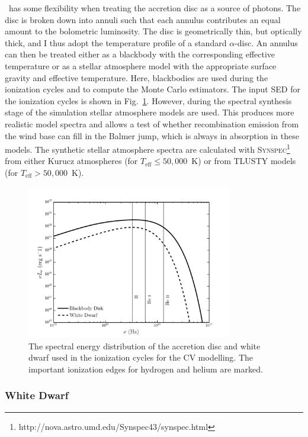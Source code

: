 \py\ has some flexibility when treating the accretion 
disc as a source of photons. The disc is broken down into annuli 
such that each annulus contributes an equal amount to the bolometric
luminosity. The disc is geometrically thin, but optically
thick, and I thus adopt the temperature profile of a standard
\cite{shakurasunyaev1973} $\alpha$-disc. An annulus can then
be treated either as a blackbody with the corresponding effective
temperature or as a stellar atmosphere model with the appropriate
surface gravity and effective temperature. Here, blackbodies are used
during the ionization cycles and to compute the Monte Carlo
estimators. The input SED for the ionization cycles is shown in 
Fig.~\ref{cv_model_sed}.
However, during the spectral synthesis stage of the 
simulation stellar atmosphere models are used. This produces more
realistic model spectra and allows a test of whether recombination
emission from the wind base can fill in the Balmer jump, which is
always in absorption in these models. 
The synthetic stellar atmosphere spectra are calculated with
\textsc{Synspec}\footnote{http://nova.astro.umd.edu/Synspec43/synspec.html}
from either Kurucz \citep{kurucz1991} atmospheres (for $T_{\mathrm{eff}} \leq
50,000$~K) or from \textsc{TLUSTY} \citep{tlusty} models (for $T_{\mathrm{eff}} > 50,000$~K). 

\begin{figure} 
\centering
\includegraphics[width=0.8\textwidth]{figures/05-cvpaper/sed.png}
\caption{The spectral energy distribution of the 
accretion disc and white dwarf used in the ionization cycles for
the CV modelling. The important ionization edges for
hydrogen and helium are marked.}
\label{cv_model_sed}
\end{figure} 

\subsubsection{White Dwarf}

